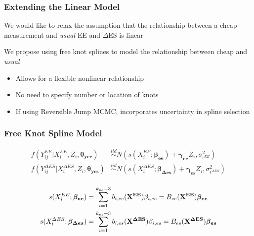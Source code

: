 \documentclass[handout]{beamer}\usepackage[]{graphicx}\usepackage[]{color}
\begin{document}
\begin{frame}
\frametitle{Extending the Linear Model}
We would like to relax the assumption that the relationship between a cheap measurement and \emph{usual} EE and $\Delta$ES is linear \\

\vspace{0.5cm}

We propose using free knot splines to model the relationship between cheap and \emph{usual}

\begin{itemize}
\item
Allows for a flexible nonlinear relationship
\item
No need to specify number or location of knots
\item
If using Reversible Jump MCMC, incorporates uncertainty in spline selection

\end{itemize}


\end{frame}


\begin{frame}
\frametitle{Free Knot Spline Model}

\begin{align*}
  f(Y_{ij}^{EE}|X_i^{EE},Z_i,\boldsymbol{\theta_{yee}}) &\overset{iid}{\sim} N(s(X_i^{EE};\boldsymbol{\beta_{ee}}) + \boldsymbol{\gamma_{ee}}Z_i,\sigma_{\epsilon^{EE}}^2) \\
    f(Y_{ij}^{\Delta ES}|X_i^{\Delta ES},Z_i,\boldsymbol{\theta_{yes}}) &\overset{iid}{\sim} N(s(X_i^{\Delta ES};\boldsymbol{\beta_{\Delta es}}) + \boldsymbol{\gamma_{es}}Z_i,\sigma_{\epsilon^{\Delta ES}}^2) \\
\end{align*}

\begin{align*}
  s(X_i^{EE};\boldsymbol{\beta_{ee}}) &= \sum_{i=1}^{k_{ee}+3} b_{i,ee}({\bf X^{EE}}) \beta_{i,ee} = B_{ee}({\bf X^{EE}}) \boldsymbol{\beta_{ee}}\\
  s(X_i^{\Delta ES};\boldsymbol{\beta_{\Delta es}}) &= \sum_{i=1}^{k_{es}+3} b_{i,es}({\bf X^{\Delta ES}}) \beta_{i,es} = B_{es}({\bf X^{\Delta ES}}) \boldsymbol{\beta_{es}}
\end{align*}

% 
% 

\end{frame}
\end{document}
